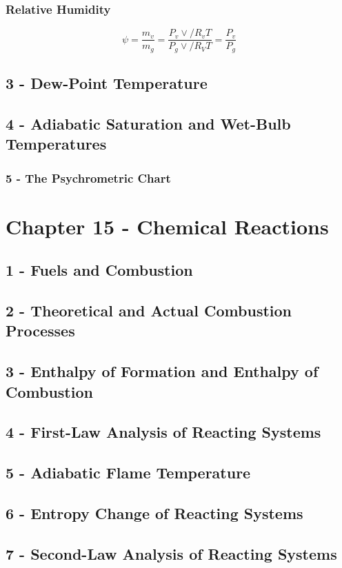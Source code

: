 \documentclass[10pt,landscape]{article}
\begin{document}
\begin{multicols}{3}
\subsubsection{Relative Humidity}
\begin{equation}
    \psi=\frac{m_v}{m_g}=\frac{P_v\vee/R_vT}{P_g\vee/R_VT}=\frac{P_v}{P_g}
\end{equation}
\subsection{3 - Dew-Point Temperature}  
\subsection{4 - Adiabatic Saturation and Wet-Bulb Temperatures}
\subsubsection{5 - The Psychrometric Chart}


\section{Chapter 15 - Chemical Reactions}
\subsection{1 - Fuels and Combustion}
\subsection{2 - Theoretical and Actual Combustion Processes}
\subsection{3 - Enthalpy of Formation and Enthalpy of Combustion}
\subsection{4 - First-Law Analysis of Reacting Systems}
\subsection{5 - Adiabatic Flame Temperature}
\subsection{6 - Entropy Change of Reacting Systems}
\subsection{7 - Second-Law Analysis of Reacting Systems}

%
%

\end{multicols}
\end{document}
